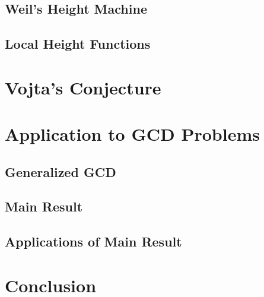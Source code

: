 \documentclass[12pt, leqno]{article}
\begin{document}
\subsection{Weil's Height Machine}
\let\clearpage\relax

\subsection{Local Height Functions}
\let\clearpage\relax


\newpage
\section{Vojta's Conjecture}
\let\clearpage\relax

\newpage
\section{Application to GCD Problems}

\subsection{Generalized GCD}
\let\clearpage\relax

\subsection{Main Result}
\let\clearpage\relax

\subsection{Applications of Main Result}
\let\clearpage\relax

\newpage
\section{Conclusion}
\let\clearpage\relax

\newpage
\printbibliography
\newpage
\end{document}
